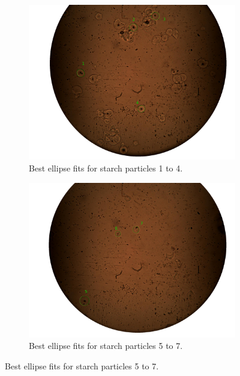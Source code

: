 \begin{figure}[h!]
    \begin{subfigure}[b]{0.475\textwidth}
        \centering
        \includegraphics[width=\textwidth, frame]{afbeeldingen/size/zetmeel/zetmeel_1.png}
        \caption{Best ellipse fits for starch particles 1 to 4.}   
        \label{fig_zetmeel_1}
    \end{subfigure}
    \hspace*{\fill}
    \begin{subfigure}[b]{0.475\textwidth}
        \centering
        \includegraphics[width=\textwidth, frame]{afbeeldingen/size/zetmeel/zetmeel_2.png}
        \caption{Best ellipse fits for starch particles 5 to 7.}   
        \label{fig_zetmeel_2}
    \end{subfigure}
    

\end{figure}
